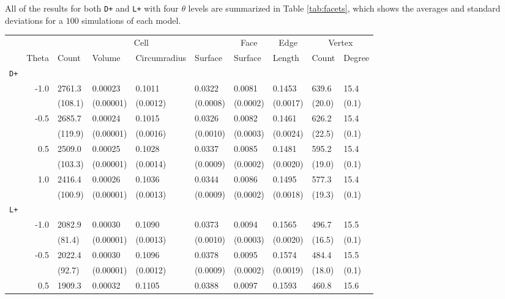 All of the results for both \texttt{D+} and \texttt{L+} with four $\theta$ levels are summarized in Table \ref{tab:facets}, which shows the averages and standard deviations for a $100$ simulations of each model.


\begin{landscape}
\begin{table}\centering
{}
\begin{tabular}{lrllllllll}\toprule
&& \multicolumn{4}{c}{Cell} & \multicolumn{1}{c}{Face} & \multicolumn{1}{c}{Edge} & \multicolumn{2}{c}{Vertex} \\ 
\cmidrule(lr){3-6} \cmidrule(lr){7-7} \cmidrule(lr){8-8} \cmidrule(lr){9-10}
& Theta &  Count & Volume & Circumradius & Surface & Surface & Length & Count & Degree \\
\midrule
\texttt{D+} \\
 & -1.0 &  2761.3 &  0.00023 &  0.1011 &  0.0322 &  0.0081 &  0.1453 &  639.6 &  15.4 \\
 & &  (108.1) &  (0.00001) &  (0.0012) &  (0.0008) &  (0.0002) &  (0.0017) &  (20.0) &  (0.1) \\
 & -0.5 &  2685.7 &  0.00024 &  0.1015 &  0.0326 &  0.0082 &  0.1461 &  626.2 &  15.4 \\
 & &  (119.9) &  (0.00001) &  (0.0016) &  (0.0010) &  (0.0003) &  (0.0024) &  (22.5) &  (0.1) \\
 & 0.5 &  2509.0 &  0.00025 &  0.1028 &  0.0337 &  0.0085 &  0.1481 &  595.2 &  15.4 \\
 & &  (103.3) &  (0.00001) &  (0.0014) &  (0.0009) &  (0.0002) &  (0.0020) &  (19.0) &  (0.1) \\
 & 1.0 &  2416.4 &  0.00026 &  0.1036 &  0.0344 &  0.0086 &  0.1495 &  577.3 &  15.4 \\
 & &  (100.9) &  (0.00001) &  (0.0013) &  (0.0009) &  (0.0002) &  (0.0018) &  (19.3) &  (0.1) \\
\texttt{L+} \\
 & -1.0 &  2082.9 &  0.00030 &  0.1090 &  0.0373 &  0.0094 &  0.1565 &  496.7 &  15.5 \\
 & &  (81.4) &  (0.00001) &  (0.0013) &  (0.0010) &  (0.0003) &  (0.0020) &  (16.5) &  (0.1) \\
 & -0.5 &  2022.4 &  0.00030 &  0.1096 &  0.0378 &  0.0095 &  0.1574 &  484.4 &  15.5 \\
 & &  (92.7) &  (0.00001) &  (0.0012) &  (0.0009) &  (0.0002) &  (0.0019) &  (18.0) &  (0.1) \\
 & 0.5 &  1909.3 &  0.00032 &  0.1105 &  0.0388 &  0.0097 &  0.1593 &  460.8 &  15.6 \\

\end{tabular}
\end{table}
\end{landscape}
